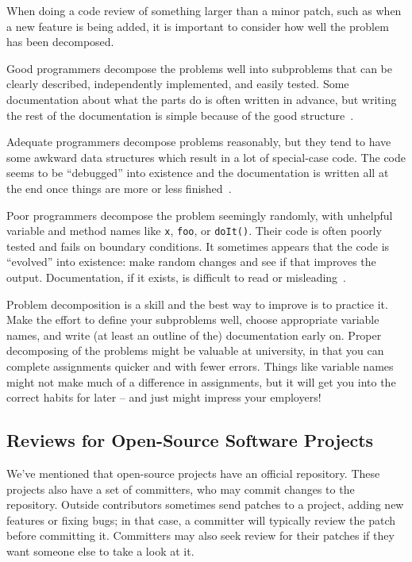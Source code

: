 When doing a code review of something larger than a minor patch, such as when a new feature is being added, it is important to consider how well the problem has been decomposed. 

Good programmers decompose the problems well into subproblems that can be clearly described, independently implemented, and easily tested. Some documentation about what the parts do is often written in advance, but writing the rest of the documentation is simple because of the good structure~\cite{pumps}.

Adequate programmers decompose problems reasonably, but they tend to have some awkward data structures which result in a lot of special-case code. The code seems to be ``debugged'' into existence and the documentation is written all at the end once things are more or less finished~\cite{pumps}.

Poor programmers decompose the problem seemingly randomly, with unhelpful variable and method names like \texttt{x}, \texttt{foo}, or \texttt{doIt()}. Their code is often poorly tested and fails on boundary conditions. It sometimes appears that the code is ``evolved'' into existence: make random changes and see if that improves the output. Documentation, if it exists, is difficult to read or misleading~\cite{pumps}.

Problem decomposition is a skill and the best way to improve is to practice it. Make the effort to define your subproblems well, choose appropriate variable names, and write (at least an outline of the) documentation early on. Proper decomposing of the problems might be valuable at university, in that you can complete assignments quicker and with fewer errors. Things like variable names might not make much of a difference in assignments, but it will get you into the correct habits for later -- and just might impress your employers!

\subsection*{Reviews for Open-Source Software Projects}
We've mentioned that open-source projects have an official repository.
These projects also have a set of committers, who may commit changes
to the repository. Outside contributors sometimes send patches to a
project, adding new features or fixing bugs; in that case, a committer
will typically review the patch before committing it. Committers may
also seek review for their patches if they want someone else to take a
look at it.

